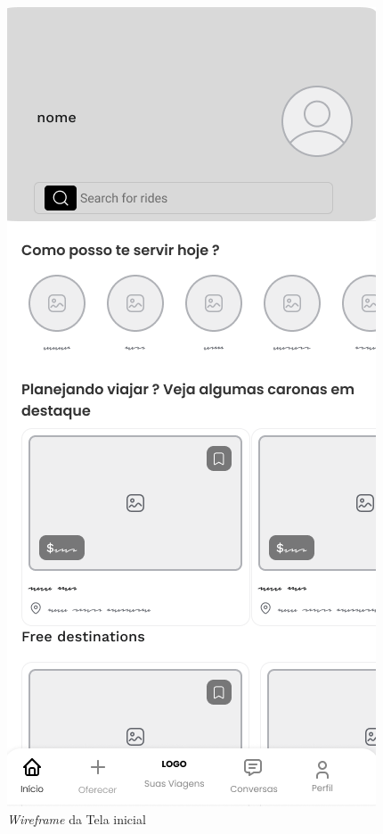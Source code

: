  \clearpage
 \begin{figure}[ht]
 	\centering
 	\begin{minipage}{0.48\textwidth} %
 		\centering
 		\caption{\textit{Wireframe} da Tela inicial}
 		\includegraphics[width=\linewidth]{img/wireframe.png}

\end{minipage}
\end{figure}
